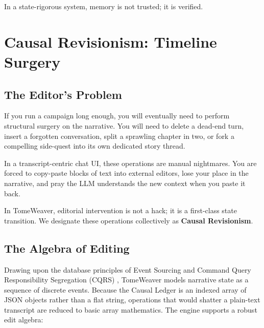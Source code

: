 \documentclass[12pt, a4paper]{article}
\begin{document}
In a state-rigorous system, memory is not trusted; it is verified.


\newpage
\section{Causal Revisionism: Timeline Surgery}
\label{sec:surgery}

\subsection{The Editor's Problem}

If you run a campaign long enough, you will eventually need to perform structural surgery on the narrative. You will need to delete a dead-end turn, insert a forgotten conversation, split a sprawling chapter in two, or fork a compelling side-quest into its own dedicated story thread. 

In a transcript-centric chat UI, these operations are manual nightmares. You are forced to copy-paste blocks of text into external editors, lose your place in the narrative, and pray the LLM understands the new context when you paste it back. 

In TomeWeaver, editorial intervention is not a hack; it is a first-class state transition. We designate these operations collectively as \textbf{Causal Revisionism}.

\subsection{The Algebra of Editing}

Drawing upon the database principles of Event Sourcing \citep{fowler2005} and Command Query Responsibility Segregation (CQRS) \citep{young2010cqrs}, TomeWeaver models narrative state as a sequence of discrete events. Because the Causal Ledger is an indexed array of JSON objects rather than a flat string, operations that would shatter a plain-text transcript are reduced to basic array mathematics. The engine supports a robust edit algebra:
\end{document}
